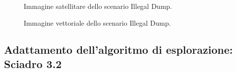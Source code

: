 \begin{figure}[H] 
    \captionsetup{justification=centering, margin=2cm, font=footnotesize}
    \begin{center}
    \end{center}
    \caption{Immagine satellitare dello scenario Illegal Dump.}
    \label{dump_map}
\end{figure}

\begin{figure}[H] 
    \captionsetup{justification=centering, margin=2cm, font=footnotesize}
    \begin{center}
    \end{center}
    \caption{Immagine vettoriale dello scenario Illegal Dump.}
    \label{dump_scenario}
\end{figure}

\subsection{Adattamento dell'algoritmo di esplorazione: \\Sciadro 3.2} \label{paragrafo_esplorazione_sciadro}

